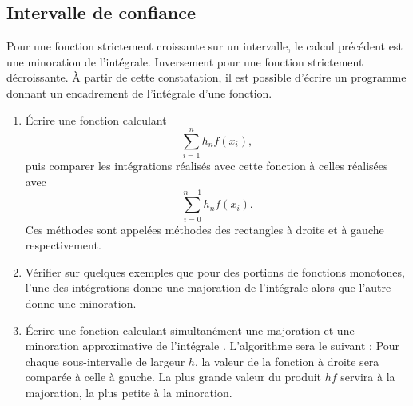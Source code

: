 \subsection{Intervalle de confiance}
Pour une fonction strictement croissante sur un intervalle, le calcul précédent
est une minoration de l'intégrale. Inversement pour une fonction strictement décroissante. À partir de cette constatation, il est possible d'écrire un programme donnant un encadrement de l'intégrale d'une fonction. 
\begin{enumerate}
\item  Écrire une fonction calculant 
 $$\sum_{i=1}^n h_n f(x_i),$$
puis comparer les intégrations réalisés avec cette fonction à celles réalisées avec 
$$\sum_{i=0}^{n-1}h_n f(x_i).$$
Ces méthodes sont appelées méthodes des rectangles à droite et à gauche respectivement.
\item Vérifier sur quelques exemples que pour des portions de fonctions monotones, l'une des intégrations donne une majoration de l'intégrale alors que l'autre donne une minoration. 
\item Écrire une fonction calculant simultanément 
une majoration et une minoration approximative de 
l'intégrale . L'algorithme sera le suivant : 
Pour chaque sous-intervalle de largeur $h$, 
la valeur de la fonction à droite sera comparée à celle à gauche. 
La plus grande valeur du produit $hf$ servira à la majoration, 
la plus petite à la minoration.
\end{enumerate}

